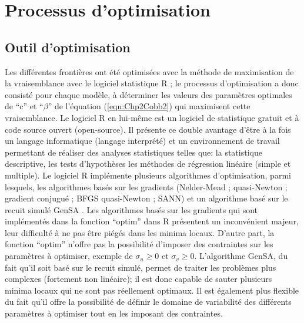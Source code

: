 \section{Processus d'optimisation}
\subsection{Outil d'optimisation}
Les différentes frontières ont été optimisées avec la méthode de maximisation de la vraisemblance avec le logiciel statistique R \cite{R@2017}; le processus d'optimisation a donc consisté pour chaque modèle, à déterminer les valeurs des paramètres optimales de \enquote{c} et \enquote{$\beta$} de l'équation (\ref{eqn:Chp2Cobb2}) qui maximisent cette vraisemblance. Le logiciel R en lui-même est un logiciel de statistique gratuit et à code source ouvert (open-source). Il présente ce double avantage d'être à la fois un langage informatique (langage interprété) et un environnement de travail permettant de réaliser des analyses statistiques telles que: la statistique descriptive, les tests d’hypothèses les méthodes de régression linéaire (simple et multiple). Le logiciel R implémente plusieurs algorithmes d'optimisation, parmi lesquels, les algorithmes basés sur les gradients (Nelder-Mead ; quasi-Newton ; gradient conjugué ; BFGS quasi-Newton ; SANN) et un algorithme basé sur le recuit simulé GenSA \cite{GenSA@2012}. Les algorithmes basés sur les gradients qui sont implémentés dans la fonction \enquote{optim} dans R présentent un inconvénient majeur, leur difficulté à ne pas être piégés dans les minima locaux. D'autre part, la fonction \enquote{optim} n'offre pas la possibilité d'imposer des contraintes sur les paramètres à optimiser, exemple de $\sigma_{u} ≥ 0$ et $\sigma_{v} ≥ 0$. L’algorithme GenSA, du fait qu'il soit basé sur le recuit simulé, permet de traiter les problèmes plus complexes (fortement non linéaire); il est donc capable de sauter plusieurs minima locaux qui ne sont pas réellement optimaux. Il est également plus flexible du fait qu'il offre la possibilité de définir le domaine de variabilité des différents paramètres à optimiser tout en les imposant des contraintes.
%
